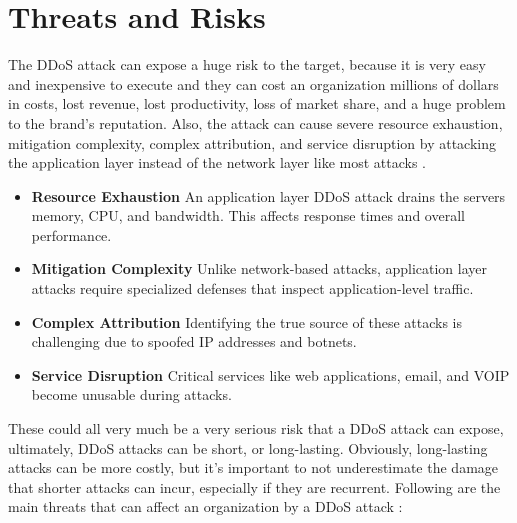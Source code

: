 \documentclass[a4paper, 12pt]{report} %
\begin{document}
        \section{Threats and Risks}
            The DDoS attack can expose a huge risk to the target, because it is very easy and inexpensive to execute and they can cost an organization millions of dollars in costs, lost revenue, lost productivity, loss of market share, and a huge problem to the brand’s reputation. Also, the attack can cause severe resource exhaustion, mitigation complexity, complex attribution, and service disruption by attacking the application layer instead of the network layer like most attacks \cite{radwareShieldSquareCaptcha}.
            
                \begin{itemize}
                    \item \textbf{Resource Exhaustion}  An application layer DDoS attack drains the servers memory, CPU, and bandwidth. This affects response times and overall performance.

                    \item \textbf{Mitigation Complexity} Unlike network-based attacks, application layer attacks require specialized defenses that inspect application-level traffic.

                    \item \textbf{Complex Attribution}  Identifying the true source of these attacks is challenging due to spoofed IP addresses and botnets.

                    \item \textbf{Service Disruption}  Critical services like web applications, email, and VOIP become unusable during attacks.

                \end{itemize}

                These could all very much be a very serious risk that a DDoS attack can expose, ultimately, DDoS attacks can be short, or long-lasting. Obviously, long-lasting attacks can be more costly, but it’s important to not underestimate the damage that shorter attacks can incur, especially if they are recurrent. Following are the main threats that can affect an organization by a DDoS attack \cite{corero}:
\end{document}

